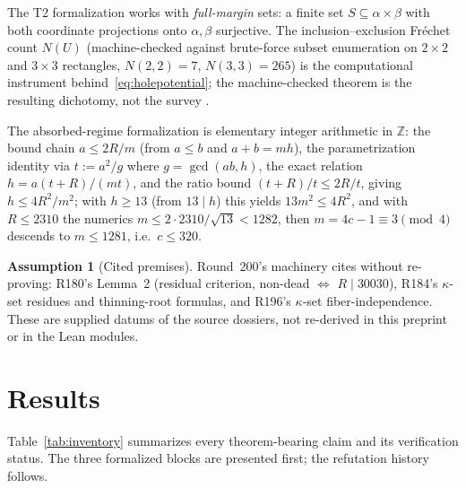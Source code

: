 \documentclass[11pt,a4paper]{article}
\theoremstyle{definition}
\newtheorem{assumption}{Assumption}
\begin{document}
The T2 formalization works with \emph{full-margin} sets: a finite set
$S\subseteq\alpha\times\beta$ with both coordinate projections onto
$\alpha,\beta$ surjective. The inclusion--exclusion Fr\'echet count
$N(U)$ (machine-checked against brute-force subset enumeration on
$2\times2$ and $3\times3$ rectangles, $N(2,2)=7$, $N(3,3)=265$) is the
computational instrument behind~\eqref{eq:holepotential}; the
machine-checked theorem is the resulting dichotomy, not the survey
\cite{D199}.

The absorbed-regime formalization is elementary integer arithmetic in
$\mathbb{Z}$: the bound chain $a\le2R/m$ (from $a\le b$ and
$a+b=mh$), the parametrization identity via $t:=a^2/g$ where
$g=\gcd(ab,h)$, the exact relation $h=a(t+R)/(mt)$, and the ratio bound
$(t+R)/t\le2R/t$, giving $h\le4R^2/m^2$; with $h\ge13$ (from $13\mid h$)
this yields $13m^2\le4R^2$, and with $R\le2310$ the numerics
$m\le2\cdot2310/\sqrt{13}<1282$, then $m=4c-1\equiv3\pmod4$ descends to
$m\le1281$, i.e.\ $c\le320$.

\begin{assumption}[Cited premises]
  \label{asm:premises}
  Round~200's machinery cites without re-proving: R180's Lemma~2
  (residual criterion, non-dead $\iff$ $R\mid30030$), R184's
  $\kappa$-set residues and thinning-root formulas, and R196's
  $\kappa$-set fiber-independence. These are supplied datums of the
  source dossiers, not re-derived in this preprint or in the Lean
  modules.
\end{assumption}

\section{Results}

Table~\ref{tab:inventory} summarizes every theorem-bearing claim and
its verification status. The three formalized blocks are presented
first; the refutation history follows.
\end{document}
